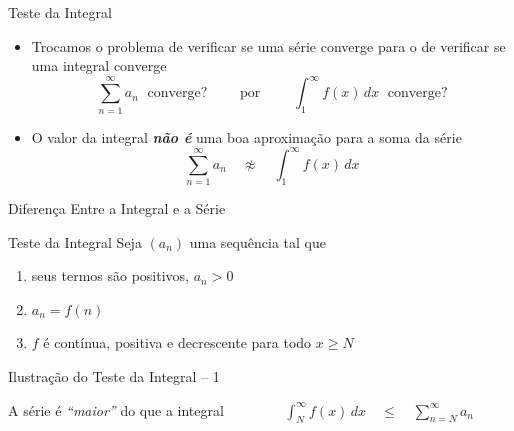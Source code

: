 \begin{frame}{Teste da Integral}
  \begin{itemize}
    \item Trocamos o problema de verificar se uma série converge para o de
    verificar se uma integral converge
    \[ \sum_{n=1}^{\infty} a_n  \;\text{ converge?}
       \qquad \text{ por } \qquad
       \int_{1}^{\infty} f(x) \,dx  \;\text{ converge?}
    \]
    \pause
    \item O valor da integral \emph{\textbf{não é}} uma boa aproximação para a soma da série
    \[ \sum_{n=1}^{\infty} a_n  \quad \not\approx \quad \int_{1}^{\infty} f(x) \,dx\]
  \end{itemize}
\end{frame}

\begin{frame}{Diferença Entre a Integral e a Série}
  \begin{center}
    
  \end{center}
\end{frame}
\begin{frame}[t]{Teste da Integral}
  Seja $(a_n)$ uma sequência tal que
  \begin{enumerate}[<+->]
    \item seus termos são positivos, $a_n>0$
    \item $a_n=f(n)$
    \item $f$ é contínua, positiva e decrescente para todo $x \geq N$
  \end{enumerate}

\end{frame}

\begin{frame}{Ilustração do Teste da Integral -- 1}
  \begin{center}
    \scalebox{.9}{}
  \end{center}

  \pause
  A série é \emph{``maior''} do que a integral
  \pause
  \(
    \qquad\qquad
    \int_{N}^{\infty} f(x)\,dx
    \quad\leq\quad
    \sum_{n=N}^{\infty} a_n
  \)
\end{frame}

